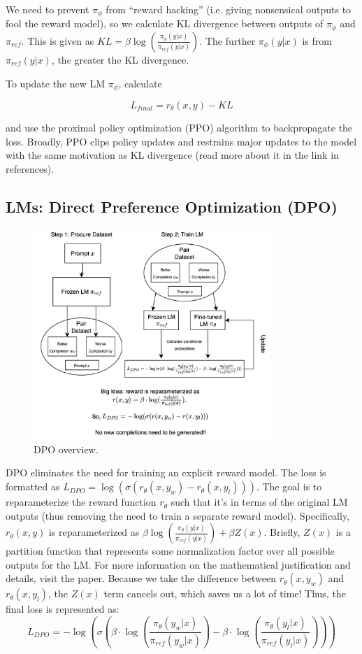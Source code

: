 \documentclass[12pt]{article}
\newcommand{\logp}[1]{%
  \log\left(#1\right)%
}
\begin{document}
We need to prevent $\pi_{\phi}$ from \enquote{reward hacking} (i.e. giving nonsensical outputs to fool the reward model), so we calculate KL divergence between outputs of $\pi_{\phi}$ and $\pi_{ref}$. This is given as $KL = \beta\logp{\frac{\pi_{\phi}(y|x)}{\pi_{ref}(y|x)}}$. The further $\pi_{\phi}(y|x)$ is from $\pi_{ref}(y|x)$, the greater the KL divergence. 

To update the new LM $\pi_{\phi}$, calculate 

$$L_{final} = r_{\theta}(x,y) - KL$$

and use the proximal policy optimization (PPO) algorithm to backpropagate the loss. Broadly, PPO clips policy updates and restrains major updates to the model with the same motivation as KL divergence (read more about it in the link in references). 

\subsection{LMs: Direct Preference Optimization (DPO)}
\begin{figure}[H]
    \centering
    \includegraphics[width=0.8\textwidth]{../media/dpo_light.png}
    \caption{DPO overview.}
    \label{fig:dpo}
\end{figure}

DPO eliminates the need for training an explicit reward model. The loss is formatted as $L_{DPO} = \log(\sigma(r_{\theta}(x, y_w) - r_{\theta}(x, y_l)))$. The goal is to reparameterize the reward function $r_{\theta}$ such that it's in terms of the original LM outputs (thus removing the need to train a separate reward model). Specifically, $r_{\theta}(x,y)$ is reparameterized as $
\beta \log(\frac{\pi_{\theta}(y | x)}{\pi_{ref}(y | x)}) + \beta Z(x)$. Briefly, $Z(x)$ is a partition function that represents some normalization factor over all possible outputs for the LM. For more information on the mathematical justification and details, visit the paper. Because we take the difference between $r_{\theta}(x, y_w)$ and $r_{\theta}(x, y_l)$, the $Z(x)$ term cancels out, which saves us a lot of time! Thus, the final loss is represented as:
\[
L_{DPO}=-\log(\sigma(\beta \cdot \log(\frac{\pi_{\theta}(y_w | x)}{\pi_{ref}(y_w | x)}) - \beta \cdot \log(\frac{\pi_{\theta}(y_l | x)}{\pi_{ref}(y_l | x)})))
\]
\end{document}
